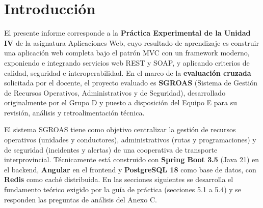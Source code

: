\section{Introducción}
El presente informe corresponde a la \textbf{Práctica Experimental de la Unidad IV} de la asignatura
Aplicaciones Web, cuyo resultado de aprendizaje es construir una aplicación web completa bajo el patrón MVC con
un framework moderno, exponiendo e integrando servicios web REST y SOAP, y aplicando criterios de calidad,
seguridad e interoperabilidad. En el marco de la \textbf{evaluación cruzada} solicitada por el docente, el
proyecto evaluado es \textbf{SGROAS} (Sistema de Gestión de Recursos Operativos, Administrativos y de Seguridad),
desarrollado originalmente por el Grupo D y puesto a disposición del Equipo E para su revisión, análisis y
retroalimentación técnica.

El sistema SGROAS tiene como objetivo centralizar la gestión de recursos operativos (unidades y conductores),
administrativos (rutas y programaciones) y de seguridad (incidentes y alertas) de una cooperativa de transporte
interprovincial. Técnicamente está construido con \textbf{Spring Boot 3.5} (Java 21) en el backend, \textbf{Angular}
en el frontend y \textbf{PostgreSQL 18} como base de datos, con \textbf{Redis} como caché distribuida. En las
secciones siguientes se desarrolla el fundamento teórico exigido por la guía de práctica (secciones 5.1 a 5.4) y se
responden las preguntas de análisis del Anexo C.